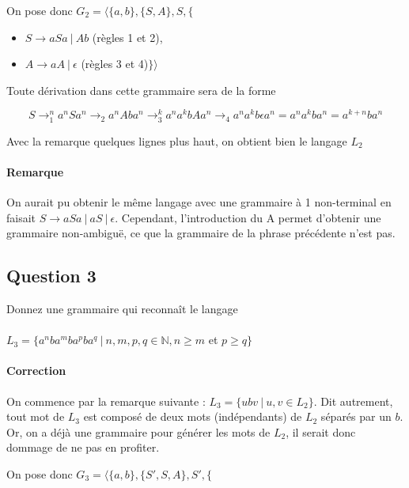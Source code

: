 \documentclass{article}[11pt]
\theoremstyle{definition}
\begin{document}
\noindent
On pose donc $G_2 = \big \langle \{a,b\}, \{S,A\},S,\{$

\begin{itemize}
\item[] $S \rightarrow aSa~|~Ab$ (règles 1 et 2),
\item[] $A \rightarrow aA~|~\epsilon $ (règles 3 et 4)$\}\big \rangle$ 
\end{itemize}

\noindent
Toute dérivation dans cette grammaire sera de la forme 

\[
S \rightarrow_1^n a^nSa^n \rightarrow_2 a^nAba^n \rightarrow_3^k a^na^kbAa^n \rightarrow_4  a^na^kb\epsilon a^n = a^na^kba^n = a^{k+n}ba^{n}  
\]

\noindent
Avec la remarque quelques lignes plus haut, on obtient bien le langage $L_2$

\paragraph*{Remarque} On aurait pu obtenir le même langage avec une grammaire à 1 non-terminal en faisait $S \rightarrow aSa ~|~ aS ~|~ \epsilon$. Cependant, l'introduction du A permet d'obtenir une grammaire non-ambiguë, ce que la grammaire de la phrase précédente n'est pas. 

\subsection*{Question 3}

Donnez une grammaire qui reconnaît le langage 

\paragraph*{}$L_3 = \{a^nba^mba^pba^q~|~n,m,p,q \in \mathbb{N}, n \geq m$ et $p \geq q\}$

\paragraph*{Correction} On commence par la remarque suivante : $L_3 = \{ubv~|~u,v \in L_2\}$. Dit autrement, tout mot de $L_3$ est composé de deux mots (indépendants) de $L_2$ séparés par un $b$. Or, on a déjà une grammaire pour générer les mots de $L_2$, il serait donc dommage de ne pas en profiter. \newline

\noindent 
On pose donc $G_3 = \big \langle \{a,b\}, \{S',S,A\},S',\{$
\end{document}
